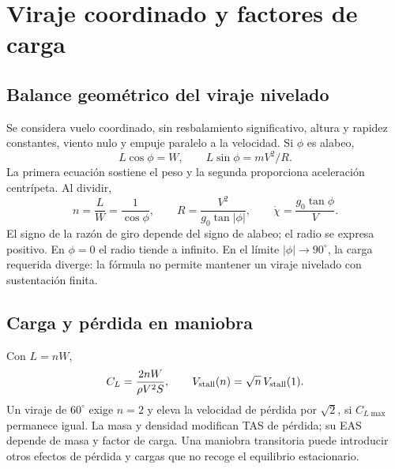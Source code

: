 \chapter{Viraje coordinado y factores de carga}\label{ch:turn}

\section{Balance geométrico del viraje nivelado}
Se considera vuelo coordinado, sin resbalamiento significativo, altura y rapidez constantes, viento nulo y empuje paralelo a la velocidad. Si $\phi$ es alabeo,
\begin{equation}
L\cos\phi=W,\qquad L\sin\phi=mV^2/R.
\end{equation}
La primera ecuación sostiene el peso y la segunda proporciona aceleración centrípeta. Al dividir,
\begin{equation}
n=\frac LW=\frac1{\cos\phi},\qquad
R=\frac{V^2}{g_0\tan|\phi|},\qquad
\dot\chi=\frac{g_0\tan\phi}{V}.
\label{eq:turn}
\end{equation}
El signo de la razón de giro depende del signo de alabeo; el radio se expresa positivo. En $\phi=0$ el radio tiende a infinito. En el límite $|\phi|\to90^\circ$, la carga requerida diverge: la fórmula no permite mantener un viraje nivelado con sustentación finita.


\section{Carga y pérdida en maniobra}
Con $L=nW$,
\begin{equation}
C_L=\frac{2nW}{\rho V^2S},\qquad
V_{\rm stall}(n)=\sqrt n\,V_{\rm stall}(1).
\end{equation}
Un viraje de $60^\circ$ exige $n=2$ y eleva la velocidad de pérdida por $\sqrt2$, si $C_{L\max}$ permanece igual. La masa y densidad modifican TAS de pérdida; su EAS depende de masa y factor de carga. Una maniobra transitoria puede introducir otros efectos de pérdida y cargas que no recoge el equilibrio estacionario.


